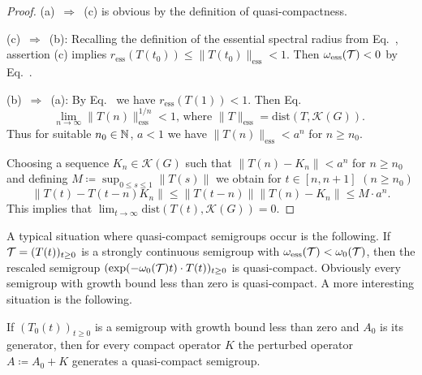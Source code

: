 \begin{proof}
(a)~$\Rightarrow$~(c) is obvious by the definition of quasi-compactness.

(c)~$\Rightarrow$~(b): Recalling the definition of the essential spectral radius from 
 Eq.~,
assertion (c) implies 
$r_{\text{ess}}(T(t_0)) \leq \|T(t_0)\|_{\text{ess}} < 1 .$ 
Then  $\omega_{\text{ess}}(\mathcal{T}) < 0 $ by  
Eq.~.

(b)~$\Rightarrow$~(a): By 
 Eq.~
we have $r_{\text{ess}}(T(1)) < 1$. 
Then 
 Eq.~
\[
\text{
$\lim_{n \to \infty}\|T(n)\|_{\text{ess}}^{1/n} < 1$,  where $\|T\|_{\text{ess}} = \mathrm{dist}(T,\mathcal{K}(G))$. }
\]
Thus for suitable $n_{0} \in \mathbb{N}$, $a < 1$ we have $\|T(n)\|_{\text{ess}} < a^n$ for $n \geq n_{0}$.

Choosing a sequence $K_n \in \mathcal{K}(G)$ such that $\|T(n) - K_n\| < a^n$ for $n \geq n_{0}$ and defining $M \coloneq \sup_{0 \leq s \leq 1}\|T(s)\|$ we obtain for $t \in [n,n+1]$ $(n \geq n_{0})$ 
\[
\|T(t) - T(t-n)K_n\| \leq \|T(t-n)\|\|T(n) - K_n\| \leq M \cdot a^n .
\] 
This implies that $\lim_{t \to \infty}\mathrm{dist}(T(t),\mathcal{K}(G)) = 0 $.
\end{proof}
A typical situation where quasi-compact semigroups occur is the following. 
If\/ $\TT = (T(t))_{t \geq 0}$ is a strongly continuous semigroup with $\omega_{\text{ess}}(\mathcal{T}) < \omega_{0}(\mathcal{T})$, then the rescaled semigroup $(\exp(-\omega_{0}(\TT)t)\cdot T(t))_{t \geq 0}$ is quasi-compact. 
Obviously every semigroup with growth bound less than zero is quasi-compact. 
A more interesting situation is the following.

If\/ $(T_{0}(t))_{t \geq 0}$ is a semigroup with growth bound less than zero and $A_{0}$ is its generator, then for every compact operator $K$ the perturbed operator $A \coloneq A_{0} + K$ generates a quasi-compact semigroup.
	
